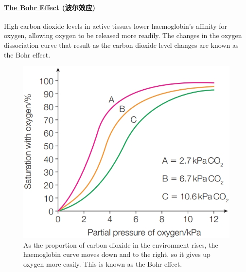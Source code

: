 \paragraph{\underline{The Bohr Effect} (波尔效应)}
High carbon dioxide levels in active tissues lower haemoglobin's affinity for oxygen, allowing oxygen to be released more readily.
The changes in the oxygen dissociation curve that result as the carbon dioxide level changes are known as the Bohr effect.
\begin{figure}[H]
    \centering
    \includegraphics[scale=0.25]{Biology/1B/Images/1B-2-4.png}
    \caption{As the proportion of carbon dioxide in the environment rises, the haemoglobin curve moves down and to the right, so
    it gives up oxygen more easily. This is known as the Bohr effect.}
\end{figure}

